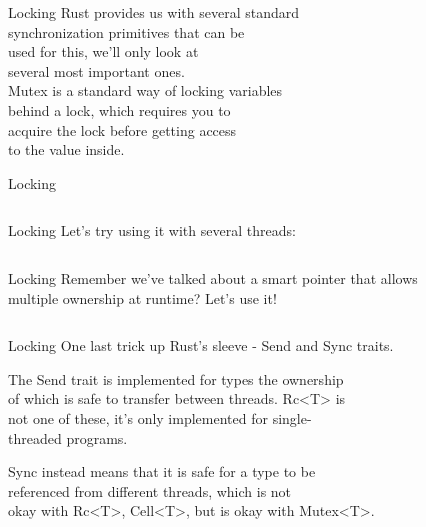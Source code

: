 \documentclass[usenames,dvipsnames,10pt,aspectratio=169]{beamer}
\begin{document}
\begin{frame}{Locking}
	\Large
	Rust provides us with several standard\\
	synchronization primitives that can be\\
	used for this, we'll only look at\\
	several most important ones.\\
	\vspace{0.3cm}
	\textcolor{ucuyellow}{Mutex} is a standard way of locking variables\\
	behind a lock, which requires you to\\
	acquire the lock before getting access\\
	to the value inside.
\end{frame}

\begin{frame}{Locking}
	\vspace{0.3cm}
	\inputminted[fontsize=\large]{rust}{code/mutex1.rs}
\end{frame}

\begin{frame}{Locking}
	Let's try using it with several threads:\\
	\inputminted[fontsize=\footnotesize]{rust}{code/mutex2.rs}
	\vspace{0.3cm}
\end{frame}

\begin{frame}{Locking}
	Remember we've talked about a smart pointer that allows\\
	multiple ownership at runtime? Let's use it!
	\inputminted[fontsize=\footnotesize]{rust}{code/mutex3.rs}
	\vspace{0.3cm}
\end{frame}

\begin{frame}{Locking}
	One last trick up Rust's sleeve - \textcolor{ucuyellow}{Send}
	and \textcolor{ucuyellow}{Sync} traits.\\
	
	\vspace{0.3cm}

	The \textcolor{ucuyellow}{Send} trait is implemented for types
	the ownership\\
	of which is safe to transfer between
	threads. \textcolor{ucuyellow}{Rc<T>} is\\
	not one of these, it's only implemented for single-\\
	threaded programs.

	\vspace{0.3cm}

	\textcolor{ucuyellow}{Sync} instead means that it
	is safe for a type to be\\
	referenced from different threads, which is not\\
	okay with \textcolor{ucuyellow}{Rc<T>}, 
	\textcolor{ucuyellow}{Cell<T>}, but
	is okay with \textcolor{ucuyellow}{Mutex<T>}.
\end{frame}
\end{document}
